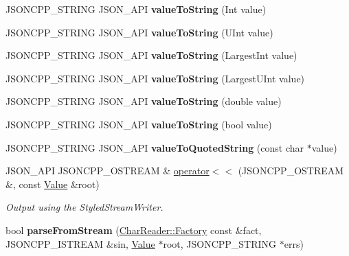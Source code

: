 \begin{DoxyCompactItemize}
\mbox{\label{namespaceJson_a498503e8f49d6a3811e3c9f6757da60d}} 
J\+S\+O\+N\+C\+P\+P\+\_\+\+S\+T\+R\+I\+NG J\+S\+O\+N\+\_\+\+A\+PI {\bfseries value\+To\+String} (Int value)
\item 
\mbox{\label{namespaceJson_ab2cb54f173193c8d27c3eb7f10b6e79a}} 
J\+S\+O\+N\+C\+P\+P\+\_\+\+S\+T\+R\+I\+NG J\+S\+O\+N\+\_\+\+A\+PI {\bfseries value\+To\+String} (U\+Int value)
\item 
\mbox{\label{namespaceJson_a4732517cb28d203cfd4354d05952a81b}} 
J\+S\+O\+N\+C\+P\+P\+\_\+\+S\+T\+R\+I\+NG J\+S\+O\+N\+\_\+\+A\+PI {\bfseries value\+To\+String} (Largest\+Int value)
\item 
\mbox{\label{namespaceJson_a6283ea3db02efe9104ae6baff698245a}} 
J\+S\+O\+N\+C\+P\+P\+\_\+\+S\+T\+R\+I\+NG J\+S\+O\+N\+\_\+\+A\+PI {\bfseries value\+To\+String} (Largest\+U\+Int value)
\item 
\mbox{\label{namespaceJson_a3cf0c8dbbdb898c4a6fad54670b34bd1}} 
J\+S\+O\+N\+C\+P\+P\+\_\+\+S\+T\+R\+I\+NG J\+S\+O\+N\+\_\+\+A\+PI {\bfseries value\+To\+String} (double value)
\item 
\mbox{\label{namespaceJson_a0a706a1fffba4fe8a8c1ef75b2dbbfab}} 
J\+S\+O\+N\+C\+P\+P\+\_\+\+S\+T\+R\+I\+NG J\+S\+O\+N\+\_\+\+A\+PI {\bfseries value\+To\+String} (bool value)
\item 
\mbox{\label{namespaceJson_aaf777a6923bcb4cf63a2729973fe5315}} 
J\+S\+O\+N\+C\+P\+P\+\_\+\+S\+T\+R\+I\+NG J\+S\+O\+N\+\_\+\+A\+PI {\bfseries value\+To\+Quoted\+String} (const char $\ast$value)
\item 
J\+S\+O\+N\+\_\+\+A\+PI J\+S\+O\+N\+C\+P\+P\+\_\+\+O\+S\+T\+R\+E\+AM \& \hyperlink{namespaceJson_a975d1dbca8aa7a06f38d373edcb9081c}{operator$<$$<$} (J\+S\+O\+N\+C\+P\+P\+\_\+\+O\+S\+T\+R\+E\+AM \&, const \hyperlink{classJson_1_1Value}{Value} \&root)
\begin{DoxyCompactList}\small\item\em Output using the Styled\+Stream\+Writer. \end{DoxyCompactList}\item 
\mbox{\label{namespaceJson_a38f903cfdb57a6c4e86a7dcc42f3712c}} 
bool {\bfseries parse\+From\+Stream} (\hyperlink{classJson_1_1CharReader_1_1Factory}{Char\+Reader\+::\+Factory} const \&fact, J\+S\+O\+N\+C\+P\+P\+\_\+\+I\+S\+T\+R\+E\+AM \&sin, \hyperlink{classJson_1_1Value}{Value} $\ast$root, J\+S\+O\+N\+C\+P\+P\+\_\+\+S\+T\+R\+I\+NG $\ast$errs)
\end{DoxyCompactItemize}



